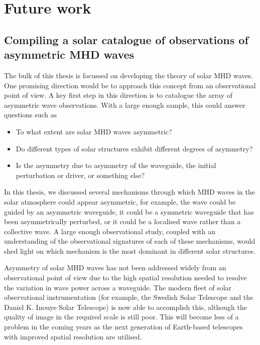 \chapter{Future work}
\label{chap: future work}


\section{Compiling a solar catalogue of observations of asymmetric MHD waves}
The bulk of this thesis is focussed on developing the theory of solar MHD waves. One promising direction would be to approach this concept from an observational point of view. A key first step in this direction is to catalogue the array of asymmetric wave observations. With a large enough sample, this could answer questions such as
\begin{itemize}
	\item To what extent are solar MHD waves asymmetric?
	\item Do different types of solar structures exhibit different degrees of asymmetry?
	\item Is the asymmetry due to asymmetry of the waveguide, the initial perturbation or driver, or something else?
\end{itemize}

In this thesis, we discussed several mechanisms through which MHD waves in the solar atmosphere could appear asymmetric, for example, the wave could  be guided by an asymmetric waveguide, it could be a symmetric waveguide that has been asymmetrically perturbed, or it could be a localised wave rather than a collective wave. A large enough observational study, coupled with an understanding of the observational signatures of each of these mechanisms, would shed light on which mechanism is the most dominant in different solar structures.

Asymmetry of solar MHD waves has not been addressed widely from an observational point of view due to the high spatial resolution needed to resolve the variation in wave power across a waveguide. The modern fleet of solar observational instrumentation (for example, the Swedish Solar Telescope and the Daniel K. Inouye Solar Telescope) is now able to accomplish this, although the quality of image in the required scale is still poor. This will become less of a problem in the coming years as the next generation of Earth-based telescopes with improved spatial resolution are utilised.


